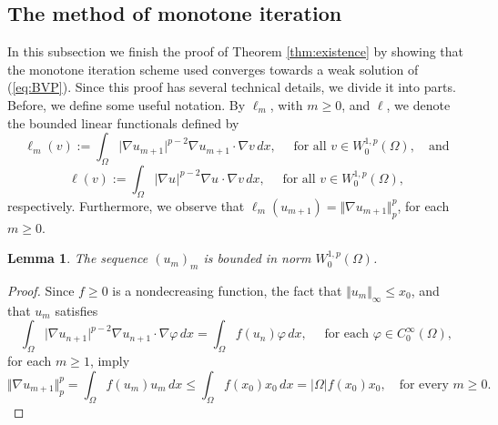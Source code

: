 \documentclass[11pt]{amsart}
\newtheorem{lemma}[theorem]{Lemma}
\theoremstyle{definition}
\begin{document}
\subsection{The method of monotone iteration}
\label{sect:monotone_iteration}
In this subsection we finish the proof of Theorem \ref{thm:existence} by showing that the monotone iteration scheme used
converges towards a weak solution
of (\ref{eq:BVP}). Since this proof has several technical details, we divide it into parts. Before, we define some useful notation. By $\ell_m$, with $m\geq 0$, and $\ell$, we denote the bounded linear functionals defined by
$$\ell_m(v):=\int_\Omega\vert\nabla u_{m+1}\vert^{p-2}\nabla u_{m+1}\cdot\nabla v\, dx,\quad\text{ for all }v\in W_0^{1,p}(\Omega),\quad\text{and}$$
$$\ell(v):=\int_\Omega\vert\nabla u_{}\vert^{p-2}\nabla u_{}\cdot\nabla v\, dx,\quad\text{ for all }v\in W_0^{1,p}(\Omega),$$
respectively. Furthermore, we observe that $\ell_m(u_{m+1})=\Vert\nabla u_{m+1}\Vert_p^p$, for each $m\geq 0$.
\medskip
\begin{lemma}\label{lem:mon_it_1}
    The sequence $(u_m)_m$ is bounded in norm $W_0^{1,p}(\Omega)$.
\end{lemma}

\begin{proof} 
Since $f\geq 0$ is a nondecreasing function, the fact that $\Vert u_m\Vert_\infty\leq x_0$, and that $u_m$ satisfies 
\begin{equation}\label{eq:WeakForm_un}
    \int_{\Omega}\vert \nabla u_{n+1}\vert^{p-2}\nabla u_{n+1}\cdot\nabla\varphi\, dx=\int_{\Omega}f(u_n)\varphi\, dx,\quad\text{ for each }\varphi\in C_0^\infty(\Omega),
\end{equation}
for each $m\geq 1$, imply
$$\Vert\nabla u_{m+1}\Vert_p^p=\int_\Omega f(u_m)u_m\, dx\leq\int_\Omega f(x_0)x_0\, dx=\vert\Omega\vert f(x_0)x_0,\quad\text{for every }m\geq 0.$$
\end{proof} 
\end{document}
